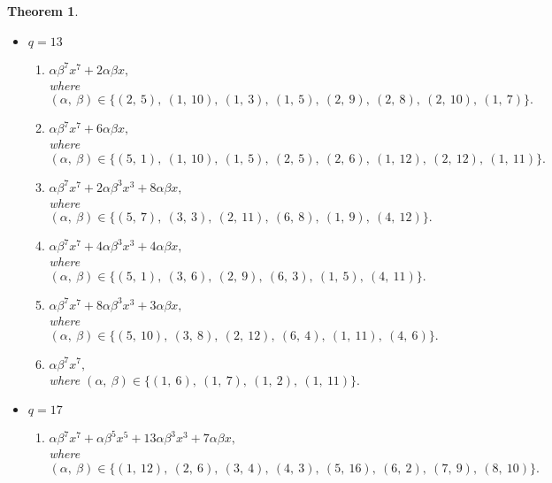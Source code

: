\documentclass[12pt,a4wide, reqno]{amsart}
\newtheorem{theorem}{Theorem}[section]
\theoremstyle{definition}
\theoremstyle{remark}
\numberwithin{equation}{section}
\begin{document}
\begin{theorem}
\begin{itemize}
\begin{enumerate}[label=\textup{(\arabic*)}]
        where $(\alpha,~\beta)\in\{(1,~8),~(2,~4),~(3,~10),~(4,~2),~(5,~6),~(1,~6),~(2,~3),~(3,~2),~(4,~7),\\~(5,~10)\}.$
        \item 
        $\alpha\beta^7x^7+2\alpha\beta^5x^5+9\alpha\beta^3x^3+6\alpha\beta x,$\\
        where $(\alpha,~\beta)\in\{(1,~5),~(2,~8),~(3,~9),~(4,~4),~(5,~1),~(1,~7),~(2,~9),~(3,~6),~(4,~10),\\~(5,~8)\}.$
    \end{enumerate}
    \item 
    $q=13$
    \begin{enumerate}[label=\textup{(\arabic*)}]
     \item 
        $\alpha\beta^7x^7+2\alpha\beta x,$\\
        where $(\alpha,~\beta)\in\{(2,~5),~(1,~10),~(1,~3),~(1,~5),~(2,~9),~(2,~8),~(2,~10),~(1,~7)\}.$
         \item 
        $\alpha\beta^7x^7+6\alpha\beta x,$\\
        where $(\alpha,~\beta)\in\{(5,~1),~(1,~10),~(1,~5),~(2,~5),~(2,~6),~(1,~12),~(2,~12),~(1,~11)\}.$
         \item 
        $\alpha\beta^7x^7+2\alpha\beta^3 x^3+8\alpha\beta x,$\\
        where $(\alpha,~\beta)\in\{(5,~7),~(3,~3),~(2,~11),~(6,~8),~(1,~9),~(4,~12)\}.$
        \item 
        $\alpha\beta^7x^7+4\alpha\beta^3 x^3+4\alpha\beta x,$\\
        where $(\alpha,~\beta)\in\{(5,~1),~(3,~6),~(2,~9),~(6,~3),~(1,~5),~(4,~11)\}.$
        \item 
        $\alpha\beta^7x^7+8\alpha\beta^3 x^3+3\alpha\beta x,$\\
        where $(\alpha,~\beta)\in\{(5,~10),~(3,~8),~(2,~12),~(6,~4),~(1,~11),~(4,~6)\}.$
        \item
        $\alpha\beta^7x^7,$\\
        where $(\alpha,~\beta)\in\{(1,~6),~(1,~7),~(1,~2),~(1,~11)\}.$
    \end{enumerate}
    \item
    $q=17$
    \begin{enumerate}[label=\textup{(\arabic*)}]
         \item 
        $\alpha\beta^7x^7+\alpha\beta^5 x^5+13\alpha\beta^3x^3+7\alpha\beta x,$\\
        where $(\alpha,~\beta)\in\{(1,~12),~(2,~6),~(3,~4),~(4,~3),~(5,~16),~(6,~2),~(7,~9),~(8,~10)\}.$

\end{enumerate}
\end{itemize}
\end{theorem}
\end{document}
